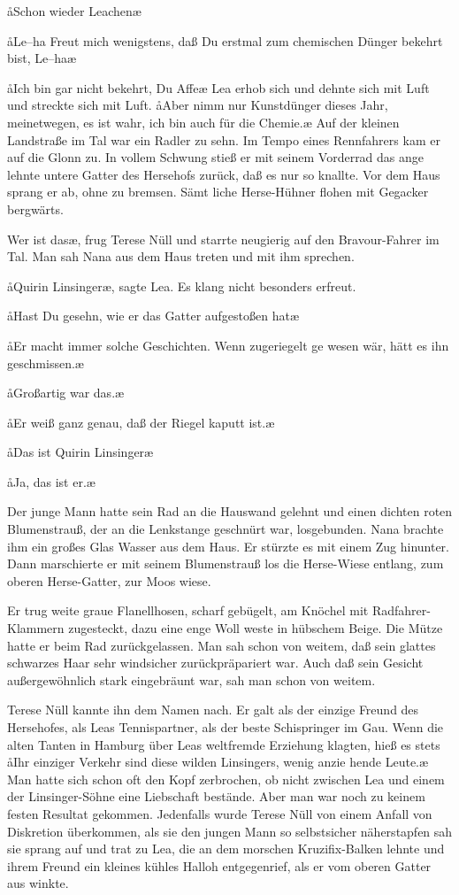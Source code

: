 \aa Schon wieder Leachen\ausr\ae

\aa Le--ha\ausr{} Freut mich wenigstens, daß Du erstmal zum
chemischen Dünger bekehrt bist, Le--ha\ausr\ae

\aa Ich bin gar nicht bekehrt, Du Affe\ausr\ae{} Lea erhob sich und
dehnte sich mit Luft und streckte sich mit Luft. \aa Aber nimm
nur Kunstdünger dieses Jahr, meinetwegen, es ist wahr, ich
bin auch für die Chemie.\ae
\abstand
Auf der kleinen Landstraße im Tal war ein Radler zu sehn.
Im Tempo eines Rennfahrers kam er auf die Glonn zu. In
vollem Schwung stieß er mit seinem Vorderrad das ange\-%
lehnte untere Gatter des Hersehofs zurück, daß es nur so
knallte. Vor dem Haus sprang er ab, ohne zu bremsen. Sämt\-%
liche Herse-Hühner flohen mit Gegacker bergwärts.

\aanah Wer ist das\ae, frug Terese Nüll und starrte neugierig auf den
Bravour-Fahrer im Tal. Man sah Nana aus dem Haus treten
und mit ihm sprechen.

\aa Quirin Linsinger\ae, sagte Lea. Es klang nicht besonders erfreut.

\aa Hast Du gesehn, wie er das Gatter aufgestoßen hat\frag\ae

\aa Er macht immer solche Geschichten. Wenn zugeriegelt ge\-%
wesen wär, hätt es ihn geschmissen.\ae

\aa Großartig war das.\ae

\aa Er weiß ganz genau, daß der Riegel kaputt ist.\ae

\aa Das ist Quirin Linsinger\frag\ae

\aa Ja, das ist er.\ae

Der junge Mann hatte sein Rad an die Hauswand gelehnt
und einen dichten roten Blumenstrauß, der an die Lenkstange
geschnürt war, losgebunden. Nana brachte ihm ein großes
Glas Wasser aus dem Haus. Er stürzte es mit einem Zug
hinunter. Dann marschierte er mit seinem Blumenstrauß los\dopp{}
die Herse-Wiese entlang, zum oberen Herse-Gatter, zur Moos\-%
wiese.

Er trug weite graue Flanellhosen, scharf gebügelt, am Knöchel
mit Radfahrer-Klammern zugesteckt, dazu eine enge Woll\-%
weste in hübschem Beige. Die Mütze hatte er beim Rad
zurückgelassen. Man sah schon von weitem, daß sein glattes
schwarzes Haar sehr windsicher zurückpräpariert war. Auch
daß sein Gesicht außergewöhnlich stark eingebräunt war, sah
man schon von weitem.

Terese Nüll kannte ihn dem Namen nach. Er galt als der einzige
Freund des Hersehofes, als Leas Tennispartner, als der beste
Schispringer im Gau. Wenn die alten Tanten in Hamburg
über Leas weltfremde Erziehung klagten, hieß es stets\dopp{} \aa Ihr
einziger Verkehr sind diese wilden Linsingers, wenig anzie\-%
hende Leute.\ae{} Man hatte sich schon oft den Kopf zerbrochen,
ob nicht zwischen Lea und einem der Linsinger-Söhne eine
Liebschaft bestände. Aber man war noch zu keinem festen
Resultat gekommen. Jedenfalls wurde Terese Nüll von einem
Anfall von Diskretion überkommen, als sie den jungen Mann
so selbstsicher näherstapfen sah\dopp{} sie sprang auf und trat zu Lea,
die an dem morschen Kruzifix-Balken lehnte und ihrem
Freund ein kleines kühles Halloh entgegenrief, als er vom
oberen Gatter aus winkte.

